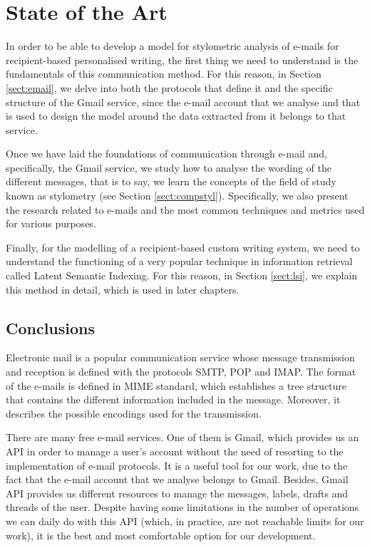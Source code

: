 \chapter{State of the Art}
\label{cap:estadoDeLaCuestion}

In order to be able to develop a model for stylometric analysis of e-mails for recipient-based personalised writing, the first thing we need to understand is the fundamentals of this communication method. For this reason, in Section \ref{sect:email}, we delve into both the protocols that define it and the specific structure of the Gmail service, since the e-mail account that we analyse and that is used to design the model around the data extracted from it belongs to that service.

Once we have laid the foundations of communication through e-mail and, specifically, the Gmail service, we study how to analyse the wording of the different messages, that is to say, we learn the concepts of the field of study known as stylometry (see Section \ref{sect:compstyl}). Specifically, we also present the research related to e-mails and the most common techniques and metrics used for various purposes.

Finally, for the modelling of a recipient-based custom writing system, we need to understand the functioning of a very popular technique in information retrieval called Latent Semantic Indexing. For this reason, in Section \ref{sect:lsi}, we explain this method in detail, which is used in later chapters.





\section{Conclusions}
Electronic mail is a popular communication service whose message transmission and reception is defined with the protocols SMTP, POP and IMAP. The format of the e-mails is defined in MIME standard, which establishes a tree structure that contains the different information included in the message. Moreover, it describes the possible encodings used for the transmission.

There are many free e-mail services. One of them is Gmail, which provides us an API in order to manage a user's account without the need of resorting to the implementation of e-mail protocols. It is a useful tool for our work, due to the fact that the e-mail account that we analyse belongs to Gmail. Besides, Gmail API provides us different resources to manage the messages, labels, drafts and threads of the user. Despite having some limitations in the number of operations we can daily do with this API (which, in practice, are not reachable limits for our work), it is the best and most comfortable option for our development.

